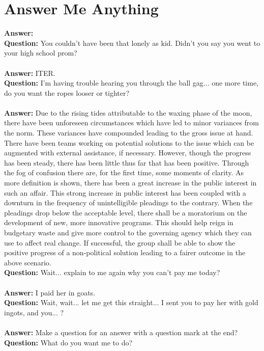 \documentclass[a4paper]{article}
\begin{document}
\section{Answer Me Anything}
\textbf{Answer:} \\
\textbf{Question:} You couldn't have been that lonely as kid. Didn't you say you went to your high school prom? \\ \\
\textbf{Answer:} ITER. \\
\textbf{Question:} I'm having trouble hearing you through the ball gag... one more time, do you want the ropes looser or tighter? \\ \\
\textbf{Answer:} Due to the rising tides attributable to the waxing phase of the moon, there have been unforeseen circumstances which have led to minor variances from the norm. These variances have compounded leading to the gross issue at hand. There have been teams working on potential solutions to the issue which can be augmented with external assistance, if necessary.
However, though the progress has been steady, there has been little thus far that has been positive. Through the fog of confusion there are, for the first time, some moments of clarity. As more definition is shown, there has been a great increase in the public interest in such an affair. This strong increase in public interest has been coupled with a downturn in the frequency of unintelligible pleadings to the contrary.
When the pleadings drop below the acceptable level, there shall be a moratorium on the development of new, more innovative programs. This should help reign in budgetary waste and give more control to the governing agency which they can use to affect real change. If successful, the group shall be able to show the positive progress of a non-political solution leading to a fairer outcome in the above scenario. \\
\textbf{Question:} Wait... explain to me again why you can't pay me today? \\ \\
\textbf{Answer:} I paid her in goats. \\
\textbf{Question:} Wait, wait... let me get this straight... I sent you to pay her with gold ingots, and you... ? \\ \\
\textbf{Answer:} Make a question for an answer with a question mark at the end? \\
\textbf{Question:} What do you want me to do? \\ \\
\end{document}
